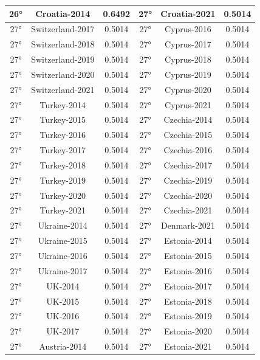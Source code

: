 \documentclass[a4paper,12pt, openright]{report}
\begin{document}
\begin{longtable}[c]{|c|c|c|c|c|c|}
    \hline
    26° &  Croatia-2014 & 0.6492 & 27° &  Croatia-2021 & 0.5014\\
    \hline
    27° &  Switzerland-2017 & 0.5014 & 27° & Cyprus-2016  & 0.5014 \\
    \hline
    27° &  Switzerland-2018  & 0.5014 & 27° & Cyprus-2017 & 0.5014 \\
    \hline
    27° &  Switzerland-2019 & 0.5014 & 27°& Cyprus-2018 & 0.5014 \\
    \hline
    27° &  Switzerland-2020 & 0.5014 & 27° &  Cyprus-2019 & 0.5014  \\
    \hline
    27° &  Switzerland-2021 & 0.5014 & 27° & Cyprus-2020 & 0.5014 \\
    \hline
    27° & Turkey-2014 & 0.5014 & 27° & Cyprus-2021  & 0.5014\\
    \hline
    27° & Turkey-2015  & 0.5014  & 27° &  Czechia-2014 & 0.5014 \\
    \hline
    27° &  Turkey-2016 & 0.5014 & 27° & Czechia-2015 & 0.5014\\
    \hline
    27° &  Turkey-2017 & 0.5014 & 27° &  Czechia-2016 & 0.5014 \\
    \hline
    27° & Turkey-2018 & 0.5014 & 27° &  Czechia-2017 & 0.5014 \\
    \hline
    27° &  Turkey-2019 & 0.5014 & 27° & Czechia-2019  & 0.5014\\
    \hline
    27° & Turkey-2020  & 0.5014 & 27° & Czechia-2020 & 0.5014 \\
    \hline
    27° &  Turkey-2021 & 0.5014 & 27° &  Czechia-2021 & 0.5014 \\
    \hline
    27° &  Ukraine-2014 & 0.5014 & 27° & Denmark-2021 & 0.5014 \\
    \hline
    27° & Ukraine-2015 & 0.5014& 27° & Estonia-2014 & 0.5014\\
    \hline
    27° &  Ukraine-2016 & 0.5014 & 27° & Estonia-2015  & 0.5014 \\
    \hline
    27° &  Ukraine-2017  & 0.5014 & 27° & Estonia-2016 & 0.5014 \\
    \hline
    27° &  UK-2014 & 0.5014 & 27° & Estonia-2017 & 0.5014 \\
    \hline
    27° & UK-2015 & 0.5014 & 27° & Estonia-2018 & 0.5014 \\
    \hline
    27° & UK-2016 & 0.5014 & 27° &  Estonia-2019 & 0.5014 \\
    \hline
    27° & UK-2017 & 0.5014 & 27° & Estonia-2020  & 0.5014\\
    \hline
    27° & Austria-2014  & 0.5014 & 27° & Estonia-2021 & 0.5014\\

\end{longtable}
\end{document}
